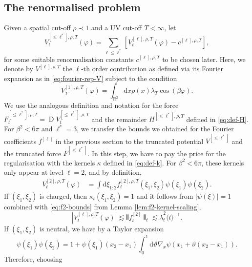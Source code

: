 \documentclass[11pt, a4paper]{scrartcl}
\numberwithin{equation}{section}
\theoremstyle{plain}
\theoremstyle{remark}
\newcommand{\mathd}{\mathrm{d}}
\newcommand{\tmop}[1]{\ensuremath{\operatorname{#1}}}
\begin{document}
\subsection{The renormalised problem}\label{sec:definitions}

Given a spatial cut-off $\rho \prec 1$ and a UV cut-off $T < \infty$, let
\begin{equation}
  V_t^{[\leqslant \ell^{\ast}], \rho, T} (\varphi) = \sum_{\ell \leqslant
  \ell^{\ast}} [V^{[\ell], \rho, T}_t (\varphi) - c^{[\ell], \rho, T}],
  \label{eq:def-V}
\end{equation}
for some suitable renormalisation constants $c^{[\ell], \rho, T}$ to be chosen
later. Here, we denote by $V^{[\ell], \rho, T}$ the $\ell$-th order
contribution as defined via its Fourier expansion as in
\eqref{eq:fourier-rep-V} subject to the condition
\[ V_T^{[1], \rho, T} (\varphi) = \int_{\mathbb{R}^2} \mathd x \rho (x)
   \lambda_T \cos (\beta \varphi) . \]
We use the analogous definition and notation for the force $F^{[\leqslant
\ell^{\ast}], \rho, T}_t = \tmop{D} V_t^{[\leqslant \ell^{\ast}], \rho, T}$ and the
remainder $H^{[\leqslant \ell^{\ast}], \rho, T}$ defined in \eqref{eq:def-H}.
For $\beta^2 < 6 \pi$ and $\ell^{\ast} = 3$, we transfer the bounds we
obtained for the Fourier coefficients $f^{[\ell]}$ in the previous section to
the truncated potential $V^{[\leqslant \ell^{\ast}]}$ and the truncated force
$F^{[\leqslant \ell^{\ast}]}$. In this step, we have to pay the price for the
regularisation with the kernels $\kappa$ defined in \eqref{eq:def-k}. For $\beta^2
< 6 \pi$, these kernels only appear at level $\ell = 2$, and by definition,
\[ \begin{aligned}
     V^{[2], \rho, T}_t (\varphi) &= 
     \int \mathd \xi_{1 : 2} f_t^{[2], \rho, T} (\xi_1,
     \xi_2) \psi (\xi_1) \psi (\xi_2) .
   \end{aligned} \]
If $(\xi_1, \xi_2)$ is charged, then $\kappa_t (\xi_1, \xi_2) = 1$ and it follows
from $| \psi (\xi) | = 1$ combined with \eqref{eq:f2-bounds} from Lemma
\ref{lem:f2-kernel-scaling},
\[ | V^{[\ell], \rho, T}_t (\varphi) | \lesssim \interleave f^{[2]}_t
   \interleave_t \lesssim \bar{\lambda}_t^2 \langle t \rangle^{- 1} . \]
If $(\xi_1, \xi_2)$ is neutral, we have by a Taylor expansion
\begin{equation}
  \psi (\xi_1) \psi (\xi_2) = 1 + \psi (\xi_1) (x_2 - x_1)  \int_0^1 \mathd
  \vartheta \nabla_x \psi (x_1 + \vartheta (x_2 - x_1)) .
  \label{eq:exp-taylor}
\end{equation}
Therefore, choosing
\end{document}
